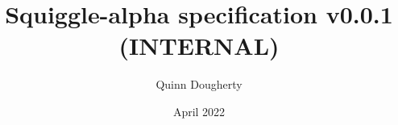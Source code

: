 \documentclass{article}
\title{Squiggle-alpha specification v0.0.1 (INTERNAL)}
\author{Quinn Dougherty}
\date{April 2022}
\begin{document}
\maketitle{}

\nocite{*}




\printbibliography
\end{document}
